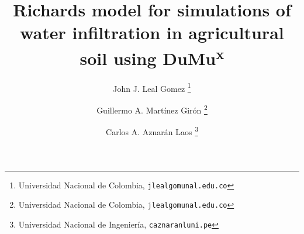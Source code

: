 \documentclass{beamer}
\title{Richards model for simulations of water infiltration in agricultural soil using DuMu\textsuperscript{x}}
\author{John J. Leal Gomez
	\thanks{
		Universidad Nacional de Colombia,
		\texttt{jlealgom\MVAt unal.edu.co}}
    \and Guillermo A. Martínez Girón
    \thanks{
    Universidad Nacional de Colombia,
		\texttt{jlealgom\MVAt unal.edu.co}}
    \and Carlos A. Aznarán Laos
    \thanks{
      Universidad Nacional de Ingeniería,
		\texttt{caznaranl\MVAt uni.pe}}
}
\begin{document}
% 

\begin{frame}
	\maketitle
\end{frame}

\begin{frame}

\end{frame}

\begin{frame}

\end{frame}


\begin{frame}

\end{frame}
\end{document}

